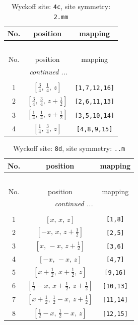 \documentclass[fleqn,8pt]{jsarticle}
\begin{document}
\renewcommand{\arraystretch}{1.2}
\begin{longtable}{ccc}
\caption{Wyckoff site: {\tt 4c}, site symmetry: {\tt 2.mm}}
 \\
 \hline \hline
No. & position & mapping \\ \hline \endfirsthead

\multicolumn{2}{l}{\tablename\ \thetable{}} \\
 \hline \hline
No. & position & mapping \\ \hline \endhead

 \hline \hline
\multicolumn{2}{r}{\footnotesize\it continued ...} \\ \endfoot

 \hline \hline
\multicolumn{2}{r}{} \\ \endlastfoot

1 & $\left[ \frac{3}{4},\, \frac{1}{4},\, z \right]$ & {\tt [1,7,12,16]} \\ \hline
2 & $\left[ \frac{3}{4},\, \frac{3}{4},\, z + \frac{1}{2} \right]$ & {\tt [2,6,11,13]} \\ \hline
3 & $\left[ \frac{1}{4},\, \frac{1}{4},\, z + \frac{1}{2} \right]$ & {\tt [3,5,10,14]} \\ \hline
4 & $\left[ \frac{1}{4},\, \frac{3}{4},\, z \right]$ & {\tt [4,8,9,15]} \\
\end{longtable}
\renewcommand{\arraystretch}{1.2}
\begin{longtable}{ccc}
\caption{Wyckoff site: {\tt 8d}, site symmetry: {\tt ..m}}
 \\
 \hline \hline
No. & position & mapping \\ \hline \endfirsthead

\multicolumn{2}{l}{\tablename\ \thetable{}} \\
 \hline \hline
No. & position & mapping \\ \hline \endhead

 \hline \hline
\multicolumn{2}{r}{\footnotesize\it continued ...} \\ \endfoot

 \hline \hline
\multicolumn{2}{r}{} \\ \endlastfoot

1 & $\left[ x,\, x,\, z \right]$ & {\tt [1,8]} \\ \hline
2 & $\left[ - x,\, x,\, z + \frac{1}{2} \right]$ & {\tt [2,5]} \\ \hline
3 & $\left[ x,\, - x,\, z + \frac{1}{2} \right]$ & {\tt [3,6]} \\ \hline
4 & $\left[ - x,\, - x,\, z \right]$ & {\tt [4,7]} \\ \hline
5 & $\left[ x + \frac{1}{2},\, x + \frac{1}{2},\, z \right]$ & {\tt [9,16]} \\ \hline
6 & $\left[ \frac{1}{2} - x,\, x + \frac{1}{2},\, z + \frac{1}{2} \right]$ & {\tt [10,13]} \\ \hline
7 & $\left[ x + \frac{1}{2},\, \frac{1}{2} - x,\, z + \frac{1}{2} \right]$ & {\tt [11,14]} \\ \hline
8 & $\left[ \frac{1}{2} - x,\, \frac{1}{2} - x,\, z \right]$ & {\tt [12,15]} \\
\end{longtable}
\end{document}
